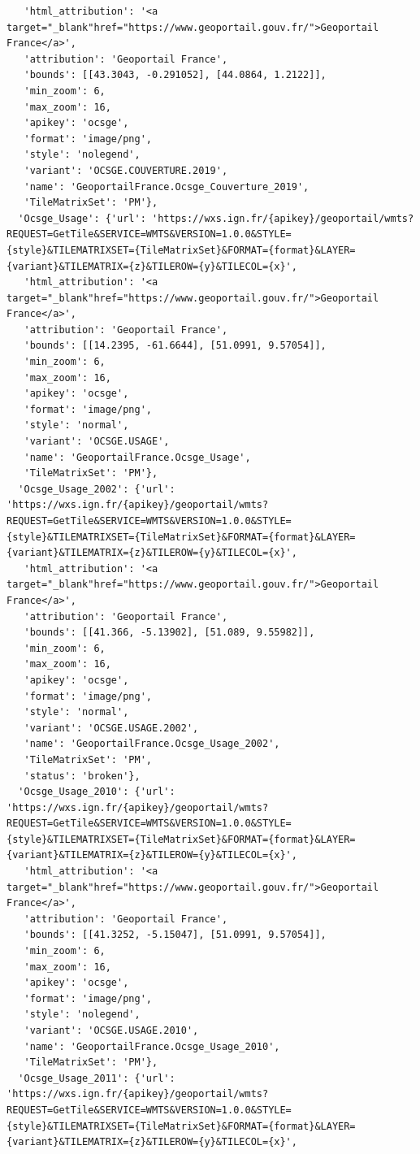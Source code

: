 \documentclass[
  letterpaper,
  DIV=11,
  numbers=noendperiod]{scrreprt}
\begin{document}
\begin{verbatim}
   'html_attribution': '<a target="_blank"href="https://www.geoportail.gouv.fr/">Geoportail France</a>',
   'attribution': 'Geoportail France',
   'bounds': [[43.3043, -0.291052], [44.0864, 1.2122]],
   'min_zoom': 6,
   'max_zoom': 16,
   'apikey': 'ocsge',
   'format': 'image/png',
   'style': 'nolegend',
   'variant': 'OCSGE.COUVERTURE.2019',
   'name': 'GeoportailFrance.Ocsge_Couverture_2019',
   'TileMatrixSet': 'PM'},
  'Ocsge_Usage': {'url': 'https://wxs.ign.fr/{apikey}/geoportail/wmts?REQUEST=GetTile&SERVICE=WMTS&VERSION=1.0.0&STYLE={style}&TILEMATRIXSET={TileMatrixSet}&FORMAT={format}&LAYER={variant}&TILEMATRIX={z}&TILEROW={y}&TILECOL={x}',
   'html_attribution': '<a target="_blank"href="https://www.geoportail.gouv.fr/">Geoportail France</a>',
   'attribution': 'Geoportail France',
   'bounds': [[14.2395, -61.6644], [51.0991, 9.57054]],
   'min_zoom': 6,
   'max_zoom': 16,
   'apikey': 'ocsge',
   'format': 'image/png',
   'style': 'normal',
   'variant': 'OCSGE.USAGE',
   'name': 'GeoportailFrance.Ocsge_Usage',
   'TileMatrixSet': 'PM'},
  'Ocsge_Usage_2002': {'url': 'https://wxs.ign.fr/{apikey}/geoportail/wmts?REQUEST=GetTile&SERVICE=WMTS&VERSION=1.0.0&STYLE={style}&TILEMATRIXSET={TileMatrixSet}&FORMAT={format}&LAYER={variant}&TILEMATRIX={z}&TILEROW={y}&TILECOL={x}',
   'html_attribution': '<a target="_blank"href="https://www.geoportail.gouv.fr/">Geoportail France</a>',
   'attribution': 'Geoportail France',
   'bounds': [[41.366, -5.13902], [51.089, 9.55982]],
   'min_zoom': 6,
   'max_zoom': 16,
   'apikey': 'ocsge',
   'format': 'image/png',
   'style': 'normal',
   'variant': 'OCSGE.USAGE.2002',
   'name': 'GeoportailFrance.Ocsge_Usage_2002',
   'TileMatrixSet': 'PM',
   'status': 'broken'},
  'Ocsge_Usage_2010': {'url': 'https://wxs.ign.fr/{apikey}/geoportail/wmts?REQUEST=GetTile&SERVICE=WMTS&VERSION=1.0.0&STYLE={style}&TILEMATRIXSET={TileMatrixSet}&FORMAT={format}&LAYER={variant}&TILEMATRIX={z}&TILEROW={y}&TILECOL={x}',
   'html_attribution': '<a target="_blank"href="https://www.geoportail.gouv.fr/">Geoportail France</a>',
   'attribution': 'Geoportail France',
   'bounds': [[41.3252, -5.15047], [51.0991, 9.57054]],
   'min_zoom': 6,
   'max_zoom': 16,
   'apikey': 'ocsge',
   'format': 'image/png',
   'style': 'nolegend',
   'variant': 'OCSGE.USAGE.2010',
   'name': 'GeoportailFrance.Ocsge_Usage_2010',
   'TileMatrixSet': 'PM'},
  'Ocsge_Usage_2011': {'url': 'https://wxs.ign.fr/{apikey}/geoportail/wmts?REQUEST=GetTile&SERVICE=WMTS&VERSION=1.0.0&STYLE={style}&TILEMATRIXSET={TileMatrixSet}&FORMAT={format}&LAYER={variant}&TILEMATRIX={z}&TILEROW={y}&TILECOL={x}',

\end{verbatim}
\end{document}
